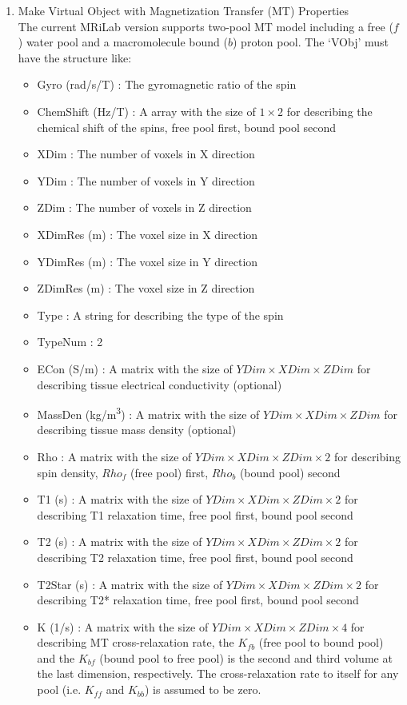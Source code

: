 \documentclass{book}%
\begin{document}
\begin{enumerate}
\item Make Virtual Object with Magnetization Transfer (MT) Properties\\

The current MRiLab version supports two-pool MT model \cite{Yarnykh2002} including a free ($f$) water pool and a macromolecule bound ($b$) proton pool. The `VObj' must have the structure like:

\begin{itemize}
	\item Gyro (rad/s/T) : The gyromagnetic ratio of the spin
	\item ChemShift (Hz/T) : A array with the size of $1 \times 2 $ for describing the chemical shift of the spins, free pool first, bound pool second
	\item XDim : The number of voxels in X direction
	\item YDim : The number of voxels in Y direction
	\item ZDim : The number of voxels in Z direction
	\item XDimRes (m) : The voxel size in X direction
	\item YDimRes (m) : The voxel size in Y direction
	\item ZDimRes (m) : The voxel size in Z direction
	\item Type : A string for describing the type of the spin
	\item TypeNum : 2
	\item ECon (S/m) : A matrix with the size of $ YDim \times XDim \times ZDim $ for describing tissue electrical conductivity (optional)
	\item MassDen (kg/m\textsuperscript{3}) : A matrix with the size of $ YDim \times XDim \times ZDim $ for describing tissue mass density (optional)
	\item Rho : A matrix with the size of $ YDim \times XDim \times ZDim \times 2 $ for describing spin density, $Rho_{f}$ (free pool) first, $Rho_{b}$ (bound pool) second
	\item T1 (s) : A matrix with the size of $ YDim \times XDim \times ZDim \times 2 $ for describing T1 relaxation time, free pool first, bound pool second
	\item T2 (s) : A matrix with the size of $ YDim \times XDim \times ZDim \times 2 $ for describing T2 relaxation time, free pool first, bound pool second
	\item T2Star (s) : A matrix with the size of $ YDim \times XDim \times ZDim \times 2 $ for describing T2* relaxation time, free pool first, bound pool second
	\item K (1/s) : A matrix with the size of $ YDim \times XDim \times ZDim \times 4 $ for describing MT cross-relaxation rate, the $K_{fb}$ (free pool to bound pool) and the $K_{bf}$ (bound pool to free pool) is the second and third volume at the last dimension, respectively. The cross-relaxation rate to itself for any pool (i.e. $K_{ff}$ and $K_{bb}$) is assumed to be zero.
\end{itemize}


\end{enumerate}
\end{document}
